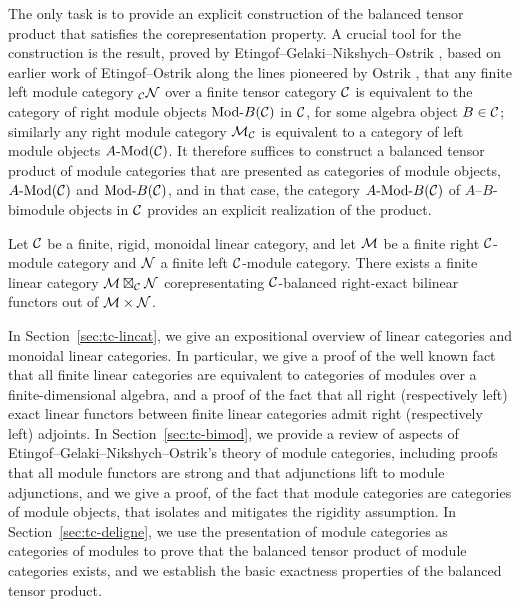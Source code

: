 \documentclass{amsart}
\begin{document}
The only task is to provide an explicit construction of the balanced tensor product that satisfies the corepresentation property.  A crucial tool for the construction is the result, proved by Etingof--Gelaki--Nikshych--Ostrik \cite[Thm 2.11.6]{EGNO}, based on earlier work of Etingof--Ostrik \cite[\S 3.2]{EO-ftc} along the lines pioneered by Ostrik \cite[Thm 1]{MR1976459}, that any finite left module category ${}_{\mathcal C} \mathcal N$ over a finite tensor category $\mathcal C$ is equivalent to the category of right module objects $\Mod{}{B}(\cC)$ in $\mathcal C$, for some algebra object $B \in \mathcal C$; similarly any right module category $\mathcal M_{\mathcal C}$ is equivalent to a category of left module objects $\Mod{A}{}(\cC)$.  It therefore suffices to construct a balanced tensor product of module categories that are presented as categories of module objects, $\Mod{A}{}(\cC)$ and $\Mod{}{B}(\cC)$, and in that case, the category $\Mod{A}{B}(\cC)$ of $A$--$B$-bimodule objects in $\mathcal C$ provides an explicit realization of the product.

\begin{theorem*}
Let $\mathcal C$ be a finite, rigid, monoidal linear category, and let $\mathcal M$ be a finite right $\mathcal C$-module category and $\mathcal N$ a finite left $\mathcal C$-module category.  There exists a finite linear category $\mathcal M \boxtimes_\mathcal C \mathcal N$ corepresentating $\mathcal C$-balanced right-exact bilinear functors out of $\mathcal M \times \mathcal N$.
\end{theorem*}

In Section~\ref{sec:tc-lincat}, we give an expositional overview of linear categories and monoidal linear categories.  In particular, we give a proof of the well known fact that all finite linear categories are equivalent to categories of modules over a finite-dimensional algebra, and a proof of the fact that all right (respectively left) exact linear functors between finite linear categories admit right (respectively left) adjoints.  In Section~\ref{sec:tc-bimod}, we provide a review of aspects of Etingof--Gelaki--Nikshych--Ostrik's theory of module categories, including proofs that all module functors are strong and that adjunctions lift to module adjunctions, and we give a proof, of the fact that module categories are categories of module objects, that isolates and mitigates the rigidity assumption.  In Section~\ref{sec:tc-deligne}, we use the presentation of module categories as categories of modules to prove that the balanced tensor product of module categories exists, and we establish the basic exactness properties of the balanced tensor product.
\end{document}
